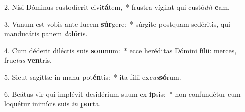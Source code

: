 2. Nisi Dóminus custodíerit civi\textbf{tá}tem,~*  frustra vígilat qui custó\textit{dit} \textbf{e}am.\

3. Vanum est vobis ante lucem \textbf{súr}gere:~*  súrgite postquam sedéritis, qui manducátis panem \textit{do}\textbf{ló}ris.\

4. Cum déderit diléctis suis \textbf{som}num:~*  ecce heréditas Dómini fílii: merces, fruc\textit{tus} \textbf{ven}tris.\

5. Sicut sagíttæ in manu pot\textbf{én}tis:~*  ita fílii ex\textit{cus}\textbf{só}rum.\

6. Beátus vir qui implévit desidérium suum ex \textbf{ip}sis:~*  non confundétur cum loquétur inimícis suis \textit{in} \textbf{por}ta.\

